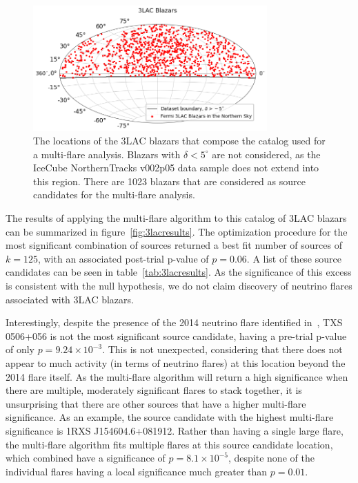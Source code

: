 \begin{figure}[h]
\centering
\includegraphics[width=0.8\textwidth]{figs/3lac_skymap.png}
\caption{The locations of the 3LAC blazars that compose the catalog used for a multi-flare analysis. Blazars with $\delta<5^{\circ}$ are not considered, as the IceCube NorthernTracks v002p05 data sample does not extend into this region. There are 1023 blazars that are considered as source candidates for the multi-flare analysis.}
\label{fig:3laccat}
\end{figure}

The results of applying the multi-flare algorithm to this catalog of 3LAC blazars can be summarized in figure~\ref{fig:3lacresults}. The optimization procedure for the most significant combination of sources returned a best fit number of sources of $k=125$, with an associated post-trial p-value of $p=0.06$. A list of these source candidates can be seen in table~\ref{tab:3lacresults}. As the significance of this excess is consistent with the null hypothesis, we do not claim discovery of neutrino flares associated with 3LAC blazars. 

Interestingly, despite the presence of the 2014 neutrino flare identified in~\cite{TXS_Archival}, TXS 0506+056 is not the most significant source candidate, having a pre-trial p-value of only $p=9.24 \times 10^{-3}$. This is not unexpected, considering that there does not appear to much activity (in terms of neutrino flares) at this location beyond the 2014 flare itself. As the multi-flare algorithm will return a high significance when there are multiple, moderately significant flares to stack together, it is unsurprising that there are other sources that have a higher multi-flare significance. As an example, the source candidate with the highest multi-flare significance is 1RXS J154604.6+081912. Rather than having a single large flare, the multi-flare algorithm fits multiple flares at this source candidate location, which combined have a significance of $p=8.1 \times 10^{-5}$, despite none of the individual flares having a local significance much greater than $p=0.01$.

